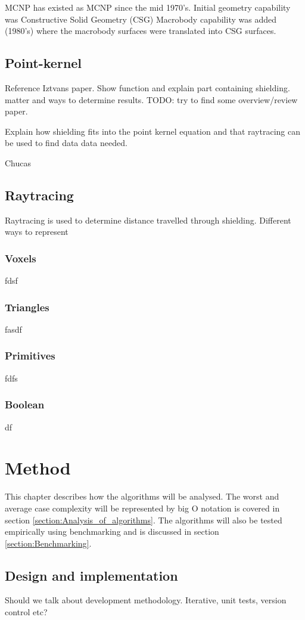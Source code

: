 \documentclass[11pt,twoside,a4paper]{report}
\begin{document}
MCNP has existed as MCNP since the mid 1970’s.
Initial geometry capability was Constructive Solid Geometry (CSG)
Macrobody capability was added (1980’s) where the macrobody
surfaces were translated into CSG surfaces.

\section{Point-kernel}
Reference Iztvans paper. Show function and explain part containing shielding.
matter and ways to determine results. TODO: try to find some overview/review paper.

Explain how shielding fits into the point kernel equation and that raytracing can be used to find data data needed.

Chucas \cite{chucas2000streaming}

\section{Raytracing}
Raytracing is used to determine distance travelled through shielding. Different ways to represent 
\subsection{Voxels}
fdsf
\subsection{Triangles}
fasdf
\subsection{Primitives}
fdfs
\subsection{Boolean}
df


\chapter{Method}
\label{chapter:Method}
This chapter describes how the algorithms will be analysed. The worst and average case complexity will be represented by big O notation is covered in section \ref{section:Analysis_of_algorithms}. The algorithms will also be tested empirically using benchmarking and is discussed in section \ref{section:Benchmarking}.

\section{Design and implementation}
Should we talk about development methodology. Iterative, unit tests, version control etc?
\end{document}
